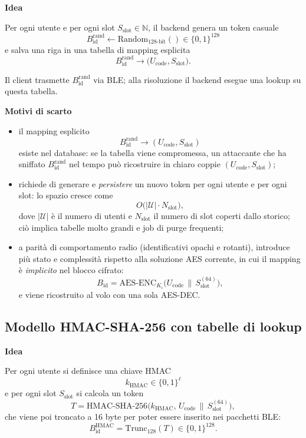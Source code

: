\documentclass[a4paper,11pt]{article}
\begin{document}
\textbf{Idea}

Per ogni utente e per ogni slot \(S_{\text{slot}} \in \mathbb{N}\), il backend genera un token casuale
\[
  B_{\text{id}}^{\mathrm{rand}} \gets \text{Random}_{128\text{-bit}}() \in \{0,1\}^{128}
\]
e salva una riga in una tabella di mapping esplicita
\[
  B_{\text{id}}^{\mathrm{rand}} \longrightarrow
  \bigl(U_{\text{code}}, S_{\text{slot}}\bigr).
\]

Il client trasmette \(B_{\text{id}}^{\mathrm{rand}}\) via BLE; alla risoluzione il backend esegue una
lookup su questa tabella.

\textbf{Motivi di scarto}

\begin{itemize}[nosep]
  \item il mapping esplicito
        \[
          B_{\text{id}}^{\mathrm{rand}} \longrightarrow (U_{\text{code}}, S_{\text{slot}})
        \]
        esiste nel database: se la tabella viene compromessa, un attaccante che ha sniffato
        \(B_{\text{id}}^{\mathrm{rand}}\) nel tempo può ricostruire in chiaro coppie
        \((U_{\text{code}}, S_{\text{slot}})\);
  \item richiede di generare e \emph{persistere} un nuovo token per ogni utente e per ogni slot:
        lo spazio cresce come
        \[
          O\bigl(|\mathcal{U}| \cdot N_{\text{slot}}\bigr),
        \]
        dove \(|\mathcal{U}|\) è il numero di utenti e \(N_{\text{slot}}\) il numero di slot coperti
        dallo storico; ciò implica tabelle molto grandi e job di purge frequenti;
  \item a parità di comportamento radio (identificativi opachi e rotanti), introduce più stato e
        complessità rispetto alla soluzione AES corrente, in cui il mapping è \emph{implicito}
        nel blocco cifrato:
        \[
          B_{\text{id}} = \mathrm{AES\text{-}ENC}_{K_i}\bigl(U_{\text{code}} \,\|\, S_{\text{slot}}^{(64)}\bigr),
        \]
        e viene ricostruito al volo con una sola AES-DEC.
\end{itemize}

\subsection{Modello HMAC-SHA-256 con tabelle di lookup}

\textbf{Idea}

Per ogni utente si definisce una chiave HMAC
\[
  k_{\text{HMAC}} \in \{0,1\}^{\ell}
\]
e per ogni slot \(S_{\text{slot}}\) si calcola un token
\[
  T = \text{HMAC-SHA-256}\bigl(k_{\text{HMAC}},\, U_{\text{code}} \,\|\, S_{\text{slot}}^{(64)}\bigr),
\]
che viene poi troncato a 16 byte per poter essere inserito nei pacchetti BLE:
\[
  B_{\text{id}}^{\mathrm{HMAC}} = \text{Trunc}_{128}(T) \in \{0,1\}^{128}.
\]
\end{document}
